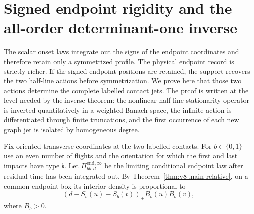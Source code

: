 \section{Signed endpoint rigidity and the all-order determinant-one inverse}
\label{sec:v22-signed-rigidity}

The scalar onset laws integrate out the signs of the endpoint coordinates and
therefore retain only a symmetrized profile.  The physical endpoint record is
strictly richer.  If the signed endpoint positions are retained, the support
recovers the two half-line actions before symmetrization.  We prove here that
those two actions determine the complete labelled contact jets.  The proof is
written at the level needed by the inverse theorem: the nonlinear half-line
stationarity operator is inverted quantitatively in a weighted Banach space,
the infinite action is differentiated through finite truncations, and the
first occurrence of each new graph jet is isolated by homogeneous degree.

Fix oriented transverse coordinates at the two labelled contacts.  For
$b\in\{0,1\}$ use an even number of flights and the orientation for which the
first and last impacts have type $b$.  Let
$\Pi^{\mathrm{end},\infty}_{bb,d}$ be the limiting conditional endpoint law
after residual time has been integrated out.  By
Theorem~\ref{thm:v8-main-relative}, on a common endpoint box its interior
density is proportional to
\begin{equation}\label{eq:v22-signed-endpoint-density}
       (d-S_b(u)-S_b(v))_+B_b(u)B_b(v),
\end{equation}
where $B_b>0$.

